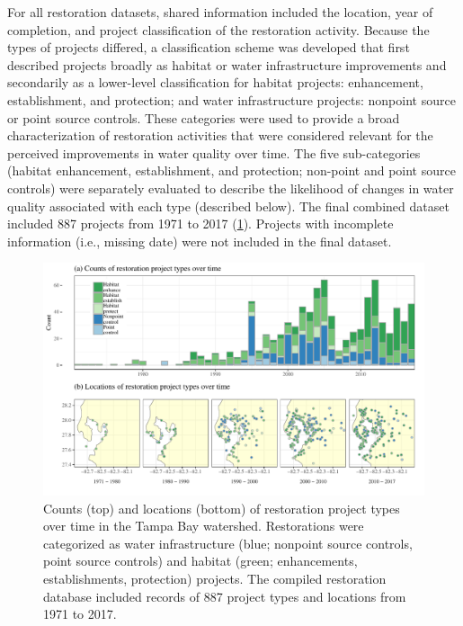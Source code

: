 \documentclass[]{article}
\begin{document}
For all restoration datasets, shared information included the location,
year of completion, and project classification of the restoration
activity. Because the types of projects differed, a classification
scheme was developed that first described projects broadly as habitat or
water infrastructure improvements and secondarily as a lower-level
classification for habitat projects: enhancement, establishment, and
protection; and water infrastructure projects: nonpoint source or point
source controls. These categories were used to provide a broad
characterization of restoration activities that were considered relevant
for the perceived improvements in water quality over time. The five
sub-categories (habitat enhancement, establishment, and protection;
non-point and point source controls) were separately evaluated to
describe the likelihood of changes in water quality associated with each
type (described below). The final combined dataset included 887 projects
from 1971 to 2017 (\cref{fig:restyrs}). Projects with incomplete
information (i.e., missing date) were not included in the final dataset.

\begin{figure}
\centerline{\includegraphics[width = \textwidth]{figs/restyrs.pdf}}
\caption{Counts (top) and locations (bottom) of restoration project types over time in the Tampa Bay watershed.  Restorations were categorized as water infrastructure (blue; nonpoint source controls, point source controls) and habitat (green; enhancements, establishments, protection) projects.  The compiled restoration database included records of 887 project types and locations from 1971 to 2017.}
\label{fig:restyrs}
\end{figure}
\end{document}
